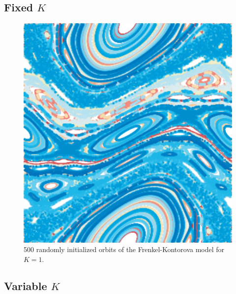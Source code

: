 
\subsection[]{Fixed $K$}



\begin{figure}
	\centering
	\includegraphics[width=0.9\columnwidth]{./img/assignment_a_pretty_low_res.pdf}
	\caption{500 randomly initialized orbits of the Frenkel-Kontorova model for $K = 1$.}
	\label{fig:a:pretty}
\end{figure}

\subsection[]{Variable $K$}